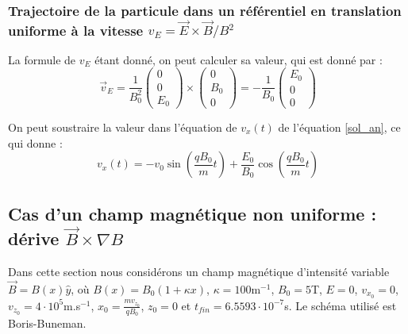 \documentclass[a4paper,12pt,twoside]{article}
\begin{document}
\subsubsection{Trajectoire de la particule dans un r\'ef\'erentiel en translation uniforme \`a la vitesse $v_E = \Vec{E}\times\Vec{B}/B^2$}

La formule de $v_E$ \'etant donn\'e, on peut calculer sa valeur, qui est donn\'e par : 
\begin{equation}\label{v_e}
\Vec{v}_E = \frac{1}{B_0^2}\begin{pmatrix}0 \\ 0 \\ E_0 \end{pmatrix}\times\begin{pmatrix}0 \\ B_0 \\ 0 \end{pmatrix} = -\frac{1}{B_0}\begin{pmatrix}E_0 \\ 0 \\ 0 \end{pmatrix}
\end{equation}

On peut soustraire la valeur dans l'\'equation de $v_x(t)$ de l'\'equation \ref{sol_an}, ce qui donne :
\begin{equation}\label{sol v_e}
v_x(t) = - v_0\sin(\frac{qB_0}{m}t) + \frac{E_0}{B_0}\cos(\frac{qB_0}{m}t)
\end{equation}



\subsection{Cas d'un champ magn\'etique non uniforme : d\'erive $\Vec{B}\times\nabla B$}
Dans cette section nous consid\'erons un champ magn\'etique d'intensit\'e variable $\Vec{B} = B(x)\hat{y}$, o\`u $B(x) = B_0(1 + \kappa x)$, $\kappa = 100$m$^{-1}$, $B_0 = 5$T, $E = 0$, $v_{x_0} = 0$, $v_{z_0} = 4\cdot10^5$m.s$^{-1}$, $x_0 = \frac{mv_{z_0}}{qB_0}$, $z_0 = 0$ et $t_{fin} = 6.5593\cdot10^{-7}$s. Le sch\'ema utilis\'e est Boris-Buneman.
\end{document}
